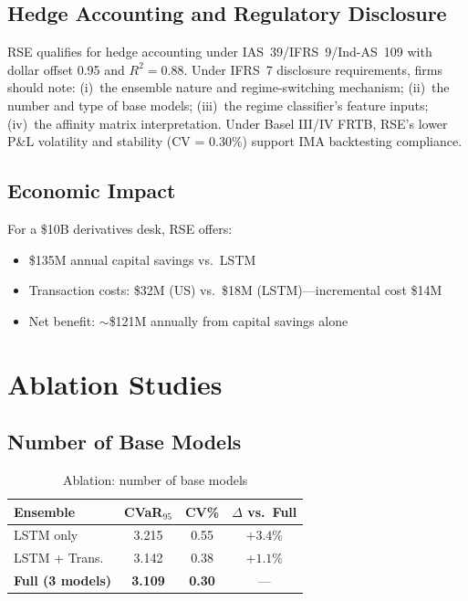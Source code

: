 \documentclass[11pt]{article}
\begin{document}
\subsection{Hedge Accounting and Regulatory Disclosure}

RSE qualifies for hedge accounting under IAS~39/IFRS~9/Ind-AS~109 with dollar offset 0.95 and $R^2 = 0.88$.  Under IFRS~7 disclosure requirements, firms should note: (i)~the ensemble nature and regime-switching mechanism; (ii)~the number and type of base models; (iii)~the regime classifier's feature inputs; (iv)~the affinity matrix interpretation.  Under Basel III/IV FRTB, RSE's lower P\&L volatility and stability (CV = 0.30\%) support IMA backtesting compliance.

\subsection{Economic Impact}

For a \$10B derivatives desk, RSE offers:
\begin{itemize}[noitemsep]
    \item \$135M annual capital savings vs.\ LSTM
    \item Transaction costs: \$32M (US) vs.\ \$18M (LSTM)---incremental cost \$14M
    \item Net benefit: $\sim$\$121M annually from capital savings alone
\end{itemize}

\section{Ablation Studies}

\subsection{Number of Base Models}

\begin{table}[t]
\centering
\caption{Ablation: number of base models}
\label{tab:ablation_models}
\small
\begin{tabular}{lccc}
\toprule
\textbf{Ensemble} & \textbf{CVaR$_{95}$} & \textbf{CV\%} & \textbf{$\Delta$ vs.\ Full} \\
\midrule
LSTM only & 3.215 & 0.55 & $+3.4\%$ \\
LSTM + Trans. & 3.142 & 0.38 & $+1.1\%$ \\
\textbf{Full (3 models)} & \textbf{3.109} & \textbf{0.30} & --- \\
\bottomrule
\end{tabular}
\end{table}
\end{document}

